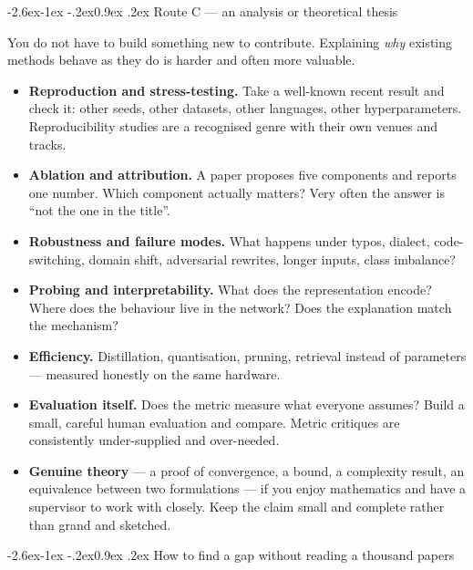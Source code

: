 \documentclass[11pt,a4paper]{article}
\makeatletter
\renewcommand\subsection{\@startsection{subsection}{2}{\z@}%
  {-2.6ex\@plus -1ex \@minus -.2ex}{0.9ex \@plus .2ex}%
  {\normalfont\large\bfseries\color{brandlight}}}
\makeatother
\begin{document}
\subsection{Route C --- an analysis or theoretical thesis}

You do not have to build something new to contribute. Explaining \emph{why}
existing methods behave as they do is harder and often more valuable.

\begin{itemize}
  \item \textbf{Reproduction and stress-testing.} Take a well-known recent
        result and check it: other seeds, other datasets, other languages,
        other hyperparameters. Reproducibility studies are a recognised genre
        with their own venues and tracks.
  \item \textbf{Ablation and attribution.} A paper proposes five components
        and reports one number. Which component actually matters? Very often
        the answer is ``not the one in the title''.
  \item \textbf{Robustness and failure modes.} What happens under typos,
        dialect, code-switching, domain shift, adversarial rewrites, longer
        inputs, class imbalance?
  \item \textbf{Probing and interpretability.} What does the representation
        encode? Where does the behaviour live in the network? Does the
        explanation match the mechanism?
  \item \textbf{Efficiency.} Distillation, quantisation, pruning, retrieval
        instead of parameters --- measured honestly on the same hardware.
  \item \textbf{Evaluation itself.} Does the metric measure what everyone
        assumes? Build a small, careful human evaluation and compare. Metric
        critiques are consistently under-supplied and over-needed.
  \item \textbf{Genuine theory} --- a proof of convergence, a bound, a
        complexity result, an equivalence between two formulations --- if you
        enjoy mathematics and have a supervisor to work with closely. Keep the
        claim small and complete rather than grand and sketched.
\end{itemize}

\subsection{How to find a gap without reading a thousand papers}
\end{document}
